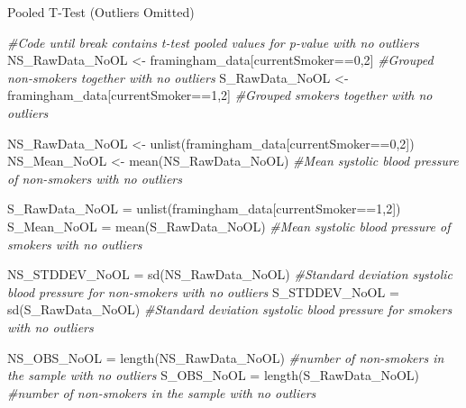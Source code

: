 \documentclass[
]{article}
\newenvironment{Shaded}{\begin{snugshade}}{\end{snugshade}}
\newcommand{\CommentTok}[1]{\textcolor[rgb]{0.56,0.35,0.01}{\textit{#1}}}
\newcommand{\DecValTok}[1]{\textcolor[rgb]{0.00,0.00,0.81}{#1}}
\newcommand{\FunctionTok}[1]{\textcolor[rgb]{0.00,0.00,0.00}{#1}}
\newcommand{\NormalTok}[1]{#1}
\newcommand{\OtherTok}[1]{\textcolor[rgb]{0.56,0.35,0.01}{#1}}
\newcommand{\SpecialCharTok}[1]{\textcolor[rgb]{0.00,0.00,0.00}{#1}}
\begin{document}
\hfill\break
Pooled T-Test (Outliers Omitted)

\begin{Shaded}
\begin{Highlighting}[]
\CommentTok{\#Code until break contains t{-}test pooled values for p{-}value with no outliers }
\NormalTok{NS\_RawData\_NoOL }\OtherTok{\textless{}{-}}\NormalTok{ framingham\_data[currentSmoker}\SpecialCharTok{==}\DecValTok{0}\NormalTok{,}\DecValTok{2}\NormalTok{] }\CommentTok{\#Grouped non{-}smokers together with no outliers}
\NormalTok{S\_RawData\_NoOL }\OtherTok{\textless{}{-}}\NormalTok{ framingham\_data[currentSmoker}\SpecialCharTok{==}\DecValTok{1}\NormalTok{,}\DecValTok{2}\NormalTok{] }\CommentTok{\#Grouped smokers together with no outliers}

\NormalTok{NS\_RawData\_NoOL }\OtherTok{\textless{}{-}} \FunctionTok{unlist}\NormalTok{(framingham\_data[currentSmoker}\SpecialCharTok{==}\DecValTok{0}\NormalTok{,}\DecValTok{2}\NormalTok{])}
\NormalTok{NS\_Mean\_NoOL }\OtherTok{\textless{}{-}} \FunctionTok{mean}\NormalTok{(NS\_RawData\_NoOL) }\CommentTok{\#Mean systolic blood pressure of non{-}smokers with no outliers}

\NormalTok{S\_RawData\_NoOL }\OtherTok{=} \FunctionTok{unlist}\NormalTok{(framingham\_data[currentSmoker}\SpecialCharTok{==}\DecValTok{1}\NormalTok{,}\DecValTok{2}\NormalTok{])}
\NormalTok{S\_Mean\_NoOL }\OtherTok{=} \FunctionTok{mean}\NormalTok{(S\_RawData\_NoOL) }\CommentTok{\#Mean systolic blood pressure of smokers with no outliers}

\NormalTok{NS\_STDDEV\_NoOL }\OtherTok{=} \FunctionTok{sd}\NormalTok{(NS\_RawData\_NoOL) }\CommentTok{\#Standard deviation systolic blood pressure for non{-}smokers with no outliers}
\NormalTok{S\_STDDEV\_NoOL }\OtherTok{=} \FunctionTok{sd}\NormalTok{(S\_RawData\_NoOL) }\CommentTok{\#Standard deviation systolic blood pressure for smokers with no outliers}

\NormalTok{NS\_OBS\_NoOL }\OtherTok{=} \FunctionTok{length}\NormalTok{(NS\_RawData\_NoOL) }\CommentTok{\#number of non{-}smokers in the sample with no outliers}
\NormalTok{S\_OBS\_NoOL }\OtherTok{=} \FunctionTok{length}\NormalTok{(S\_RawData\_NoOL) }\CommentTok{\#number of non{-}smokers in the sample with no outliers}


\end{Highlighting}
\end{Shaded}
\end{document}
